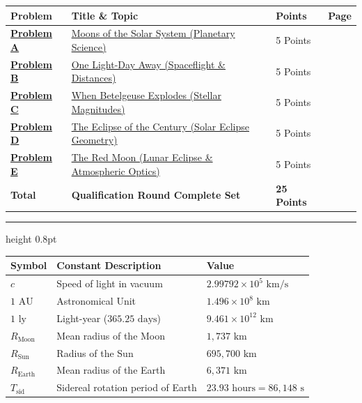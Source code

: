 \documentclass[11pt, a4paper]{article}
\begin{document}
\noindent\begin{tabularx}{\textwidth}{@{}p{2.3cm}Xp{1.8cm}p{1.2cm}@{}}
    \toprule
    \textbf{Problem} & \textbf{Title \& Topic} & \textbf{Points} & \textbf{Page} \\
    \midrule
    \hyperref[sec:probA]{\textbf{Problem A}} & \hyperref[sec:probA]{Moons of the Solar System (Planetary Science)} & 5 Points & \pageref{sec:probA} \\[6pt]
    \hyperref[sec:probB]{\textbf{Problem B}} & \hyperref[sec:probB]{One Light-Day Away (Spaceflight \& Distances)} & 5 Points & \pageref{sec:probB} \\[6pt]
    \hyperref[sec:probC]{\textbf{Problem C}} & \hyperref[sec:probC]{When Betelgeuse Explodes (Stellar Magnitudes)} & 5 Points & \pageref{sec:probC} \\[6pt]
    \hyperref[sec:probD]{\textbf{Problem D}} & \hyperref[sec:probD]{The Eclipse of the Century (Solar Eclipse Geometry)} & 5 Points & \pageref{sec:probD} \\[6pt]
    \hyperref[sec:probE]{\textbf{Problem E}} & \hyperref[sec:probE]{The Red Moon (Lunar Eclipse \& Atmospheric Optics)} & 5 Points & \pageref{sec:probE} \\
    \midrule
    \textbf{Total} & \textbf{Qualification Round Complete Set} & \textbf{25 Points} & \\
    \bottomrule
\end{tabularx}

\vspace{24pt}

\par
\vspace{4pt}
{\color{iaacrule}\hrule height 0.8pt}
\vspace{8pt}

\noindent\begin{tabularx}{\textwidth}{@{}lXl@{}}
    \toprule
    \textbf{Symbol} & \textbf{Constant Description} & \textbf{Value} \\
    \midrule
    $c$ & Speed of light in vacuum & $2.99792 \times 10^{5}\text{ km/s}$ \\
    $1\text{ AU}$ & Astronomical Unit & $1.496 \times 10^{8}\text{ km}$ \\
    $1\text{ ly}$ & Light-year ($365.25\text{ days}$) & $9.461 \times 10^{12}\text{ km}$ \\
    $R_{\text{Moon}}$ & Mean radius of the Moon & $1{,}737\text{ km}$ \\
    $R_{\text{Sun}}$ & Radius of the Sun & $695{,}700\text{ km}$ \\
    $R_{\text{Earth}}$ & Mean radius of the Earth & $6{,}371\text{ km}$ \\
    $T_{\text{sid}}$ & Sidereal rotation period of Earth & $23.93\text{ hours} = 86{,}148\text{ s}$ \\
    \bottomrule
\end{tabularx}
\end{document}
